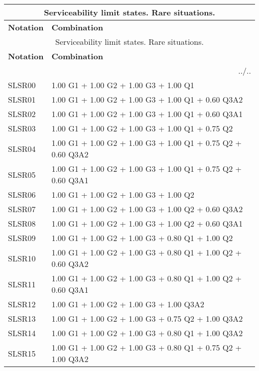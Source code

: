 \begin{center}
\begin{small}
\begin{longtable}{|l|p{10cm}|}
\hline
\multicolumn{2}{|c|}{Serviceability limit states. Rare situations.}\\
\hline
\textbf{Notation} & \textbf{Combination} \\
\hline
\endfirsthead
\hline
\multicolumn{2}{|c|}{Serviceability limit states. Rare situations.}\\
\hline
\textbf{Notation} & \textbf{Combination} \\
\hline
\endhead
\hline \multicolumn{2}{|r|}{{../..}} \\ \hline
\endfoot
\hline
\endlastfoot
SLSR00 & 1.00 G1 + 1.00 G2 + 1.00 G3 + 1.00 Q1\\
SLSR01 & 1.00 G1 + 1.00 G2 + 1.00 G3 + 1.00 Q1 + 0.60 Q3A2\\
SLSR02 & 1.00 G1 + 1.00 G2 + 1.00 G3 + 1.00 Q1 + 0.60 Q3A1\\
SLSR03 & 1.00 G1 + 1.00 G2 + 1.00 G3 + 1.00 Q1 + 0.75 Q2\\
SLSR04 & 1.00 G1 + 1.00 G2 + 1.00 G3 + 1.00 Q1 + 0.75 Q2 + 0.60 Q3A2\\
SLSR05 & 1.00 G1 + 1.00 G2 + 1.00 G3 + 1.00 Q1 + 0.75 Q2 + 0.60 Q3A1\\
SLSR06 & 1.00 G1 + 1.00 G2 + 1.00 G3 + 1.00 Q2\\
SLSR07 & 1.00 G1 + 1.00 G2 + 1.00 G3 + 1.00 Q2 + 0.60 Q3A2\\
SLSR08 & 1.00 G1 + 1.00 G2 + 1.00 G3 + 1.00 Q2 + 0.60 Q3A1\\
SLSR09 & 1.00 G1 + 1.00 G2 + 1.00 G3 + 0.80 Q1 + 1.00 Q2\\
SLSR10 & 1.00 G1 + 1.00 G2 + 1.00 G3 + 0.80 Q1 + 1.00 Q2 + 0.60 Q3A2\\
SLSR11 & 1.00 G1 + 1.00 G2 + 1.00 G3 + 0.80 Q1 + 1.00 Q2 + 0.60 Q3A1\\
SLSR12 & 1.00 G1 + 1.00 G2 + 1.00 G3 + 1.00 Q3A2\\
SLSR13 & 1.00 G1 + 1.00 G2 + 1.00 G3 + 0.75 Q2 + 1.00 Q3A2\\
SLSR14 & 1.00 G1 + 1.00 G2 + 1.00 G3 + 0.80 Q1 + 1.00 Q3A2\\
SLSR15 & 1.00 G1 + 1.00 G2 + 1.00 G3 + 0.80 Q1 + 0.75 Q2 + 1.00 Q3A2\\
\hline
\end{longtable}
\end{small}
\end{center}
